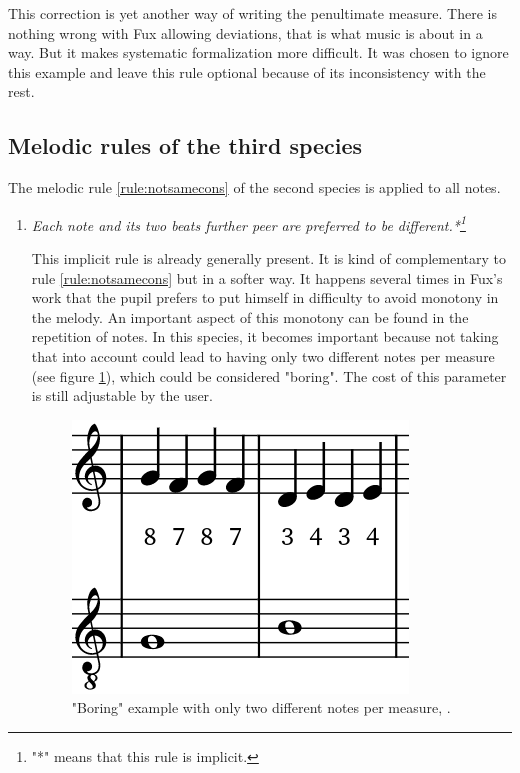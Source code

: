 \begin{enumerate}[wide, label=\bfseries 3.H\arabic*]
    This correction is yet another way of writing the penultimate measure. There is nothing wrong with Fux allowing deviations, that is what music is about in a way. But it makes systematic formalization more difficult. It was chosen to ignore this example and leave this rule optional because of its inconsistency with the rest.
\end{enumerate}

\subsection{Melodic rules of the third species}
The melodic rule \ref{rule:notsamecons} of the second species is applied to all notes.

\begin{enumerate}[wide, label=\bfseries 3.M\arabic*]
    \item\label{rule:twobeats} \textit{Each note and its two beats further peer are preferred to be different.*\footnote{"*" means that this rule is implicit.}}
    
    This implicit rule is already generally present. It is kind of complementary to rule \ref{rule:notsamecons} but in a softer way. It happens several times in Fux's work that the pupil prefers to put himself in difficulty to avoid monotony in the melody. An important aspect of this monotony can be found in the repetition of notes. In this species, it becomes important because not taking that into account could lead to having only two different notes per measure (see figure \ref{fig:twonotes}), which could be considered "boring". The cost of this parameter is still adjustable by the user.
    \begin{figure}[h]
        \centering
        \includegraphics[height=\fh]{Images/two_same_notes.png}
        \caption{"Boring" example with only two different notes per measure, .}
        \label{fig:twonotes}
    \end{figure}
\end{enumerate}

